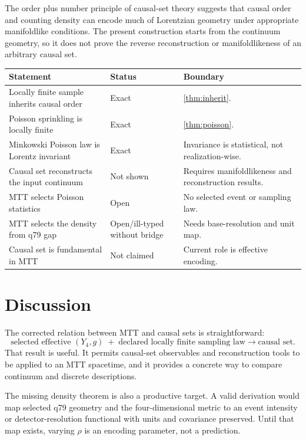 \documentclass[11pt]{article}
\theoremstyle{definition}
\theoremstyle{remark}
\begin{document}
The order plus number principle of causal-set theory suggests that causal
order and counting density can encode much of Lorentzian geometry under
appropriate manifoldlike conditions. The present construction starts from
the continuum geometry, so it does not prove the reverse reconstruction or
manifoldlikeness of an arbitrary causal set.

\begin{center}
\begin{tabularx}{\textwidth}{@{}
>{\raggedright\arraybackslash}p{}
>{\raggedright\arraybackslash}p{}
>{\raggedright\arraybackslash}X@{}}
\toprule
Statement & Status & Boundary\\
\midrule
Locally finite sample inherits causal order & Exact &
\autoref{thm:inherit}.\\
Poisson sprinkling is locally finite & Exact &
\autoref{thm:poisson}.\\
Minkowski Poisson law is Lorentz invariant & Exact &
Invariance is statistical, not realization-wise.\\
Causal set reconstructs the input continuum & Not shown &
Requires manifoldlikeness and reconstruction results.\\
MTT selects Poisson statistics & Open &
No selected event or sampling law.\\
MTT selects the density from q79 gap & Open/ill-typed without bridge &
Needs base-resolution and unit map.\\
Causal set is fundamental in MTT & Not claimed &
Current role is effective encoding.\\
\bottomrule
\end{tabularx}
\end{center}

\section{Discussion}

The corrected relation between MTT and causal sets is straightforward:
\[
\text{selected effective }(Y_4,g)
\;+\;
\text{declared locally finite sampling law}
\longrightarrow
\text{causal set}.
\]
That result is useful. It permits causal-set observables and reconstruction
tools to be applied to an MTT spacetime, and it provides a concrete way to
compare continuum and discrete descriptions.

The missing density theorem is also a productive target. A valid derivation
would map selected q79 geometry and the four-dimensional metric to an event
intensity or detector-resolution functional with units and covariance
preserved. Until that map exists, varying \(\rho\) is an encoding parameter,
not a prediction.
\end{document}
